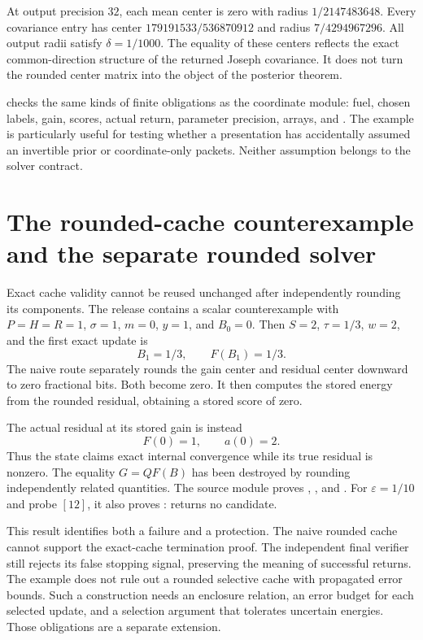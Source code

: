 At output precision $32$, each mean center is zero with radius $1/2147483648$.
Every covariance entry has center $179191533/536870912$ and radius
$7/4294967296$. All output radii satisfy $\delta=1/1000$. The equality of these
centers reflects the exact common-direction structure of the returned Joseph
covariance. It does not turn the rounded center matrix into the object of the
posterior theorem.

 checks the same kinds of finite obligations as
the coordinate module: fuel, chosen labels, gain, scores, actual return, parameter
precision, arrays, and . The example is particularly useful for
testing whether a presentation has accidentally assumed an invertible prior or
coordinate-only packets. Neither assumption belongs to the solver contract.

\section{The rounded-cache counterexample and the separate rounded solver}
\label{sec:solver-rounding-boundary}

Exact cache validity cannot be reused unchanged after independently rounding its
components. The release contains a scalar counterexample with
$P=H=R=1$, $\sigma=1$, $m=0$, $y=1$, and $B_0=0$. Then $S=2$, $\tau=1/3$,
$w=2$, and the first exact update is
\[
 B_1=1/3,\qquad F(B_1)=1/3.
\]
The naive route separately rounds the gain center and residual center downward
to zero fractional bits. Both become zero. It then computes the stored energy
from the rounded residual, obtaining a stored score of zero.

The actual residual at its stored gain is instead
\[
 F(0)=1,
 \qquad a(0)=2.
\]
Thus the state claims exact internal convergence while its true residual is
nonzero. The equality $G=QF(B)$ has been destroyed by rounding independently
related quantities. The source module  proves
, , and .
For $\varepsilon=1/10$ and probe $[12]$, it also proves
:  returns no candidate.

This result identifies both a failure and a protection. The naive rounded cache
cannot support the exact-cache termination proof. The independent final verifier
still rejects its false stopping signal, preserving the meaning of successful
returns. The example does not rule out a rounded selective cache with propagated
error bounds. Such a construction needs an enclosure relation, an error budget
for each selected update, and a selection argument that tolerates uncertain
energies. Those obligations are a separate extension.

